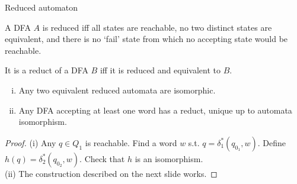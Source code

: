 \documentclass[handout]{beamer}
\begin{document}
\begin{frame}{Reduced automaton}
    
    \begin{definition}
        A DFA $A$ is \alert{reduced} iff all states are reachable, no two distinct states are equivalent, and there is no `fail' state from which no accepting state would be reachable. 
        
        It is a \alert{reduct of} a DFA $B$ iff it is reduced and equivalent to $B$.
    \end{definition}

    \begin{theorem}
        \begin{enumerate}[(i)]
            \item Any two equivalent reduced automata are isomorphic.
            \item Any DFA accepting at least one word has a reduct, unique up to automata isomorphism.            
        \end{enumerate}        
    \end{theorem}
    \begin{proof}
        \alert{(i)} Any $q\in Q_1$ is reachable. Find a word $w$ s.t. $q=\delta_1^*(q_{0_1},w)$. Define $h(q)=\delta_2^*(q_{0_2},w)$. Check that $h$ is an isomorphism. \\ \alert{(ii)} The construction described on the next slide works.        
    \end{proof}

\end{frame}
\end{document}
